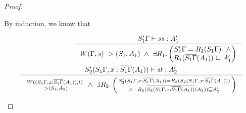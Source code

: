 \begin{proof}
\begin{itemize}
	By induction, we know that \vspace*{-2em}
	\begin{singlespace}
	\begin{align}
	\label{WcompleteLetsCase1}
	\inference{S_1'\Gamma |-s s : A_1'}{
	W(\Gamma,s) ~> (S_1,A_1)
	~\land~
	\exists R_1.
		\left(\begin{matrix}
			S_1'\Gamma=R_1(S_1\Gamma) ~~ \land \\
			R_1(\overline{S_1\Gamma}(A_1))
			\sqsubseteq A_1'
		\end{matrix}\right) }
	\\
	\label{WcompleteLetsCase2}
	\inference{S_2'(S_1\Gamma,x:\overline{S_1\Gamma}(A_1)) |-s t : A_2'}{
	\begin{smallmatrix} W((S_1\Gamma,x:\overline{S_1\Gamma}(A_1)),t) \\
		~> (S_2,A_2)
	\end{smallmatrix}
	~\land~
	\exists R_2.
		\left(\begin{smallmatrix}
			S_2'(S_1\Gamma,x:\overline{S_1\Gamma}(A_1))=R_2(S_2(S_1\Gamma,x:\overline{S_1\Gamma}(A_1))) \\ \land ~~
			R_2(\overline{S_2(S_1\Gamma,x:\overline{S_1\Gamma}(A_1))}(A_2))
			\sqsubseteq A_2'
		\end{smallmatrix}\right) }
	\end{align}
	\end{singlespace}


\end{itemize}
\end{proof}

